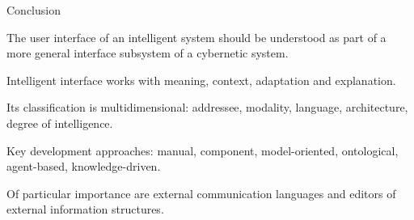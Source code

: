 \begin{frame}{Conclusion}
	\topline
	\justifying
	
	\vspace{10mm}
	
	The user interface of an intelligent system should be understood as part of a more general interface subsystem of a cybernetic system.
	
	\begin{textitemize}
		\item Intelligent interface works with meaning, context, adaptation and explanation.
		\item Its classification is multidimensional: addressee, modality, language, architecture, degree of intelligence.
		\item Key development approaches: manual, component, model-oriented, ontological, agent-based, knowledge-driven.
		\item Of particular importance are external communication languages and editors of external information structures.
	\end{textitemize}
\end{frame}


